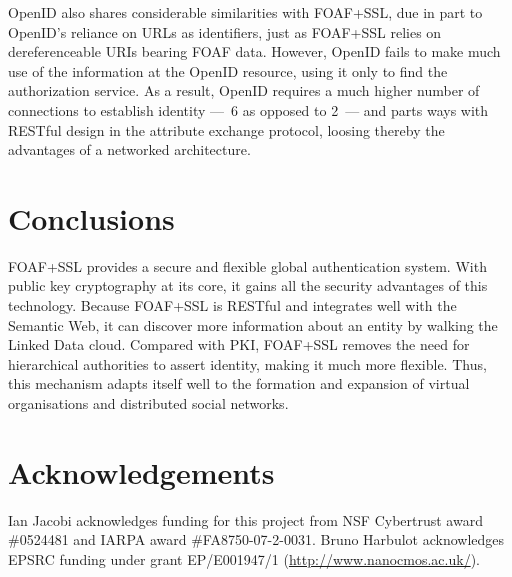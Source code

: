 \documentclass{llncs}
\begin{document}
OpenID also shares considerable similarities with FOAF+SSL, due in
part to OpenID's reliance on URLs as identifiers, just as FOAF+SSL
relies on dereferenceable URIs bearing FOAF data. However, OpenID fails to
make much use of the information at the OpenID resource, using it only
to find the authorization service. As a result, OpenID requires a much
higher number of connections to establish identity ---~6 as opposed to
2~--- and parts ways with RESTful design in the attribute exchange
protocol, loosing thereby the advantages of a networked architecture.

\section{Conclusions}

FOAF+SSL provides a secure and flexible global
authentication system.  With public key cryptography at its core, it gains all the
security advantages of this technology.
Because FOAF+SSL is RESTful and integrates well with the Semantic Web, 
it can discover more information about an entity by walking the Linked Data cloud.  Compared with PKI,
FOAF+SSL removes the need for hierarchical authorities to assert
identity, making it much more flexible.  Thus, this
mechanism adapts itself well to the formation and expansion of virtual
organisations and distributed social networks.


\section*{Acknowledgements}
{
\footnotesize
Ian Jacobi acknowledges funding for this project from NSF Cybertrust award \#0524481 and IARPA award \#FA8750-07-2-0031.
Bruno Harbulot acknowledges EPSRC funding under grant EP/E001947/1 (\url{http://www.nanocmos.ac.uk/}).
}



\end{document}
